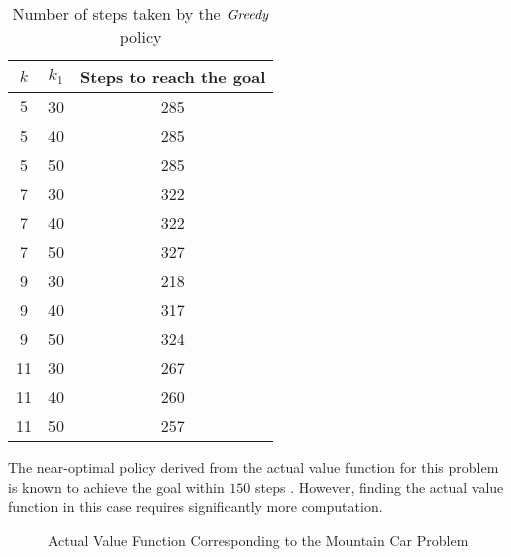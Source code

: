 \FloatBarrier
\begin{table}[H]
\begin{tabular}{|c|c|c|} \hline
$k$ & $k_1$ &Steps to reach the goal\\ \hline	
$5$ &30 &285 \\ \hline
5 &40 &285 \\ \hline
5 &50 &285 \\ \hline

7 &30 &322 \\ \hline
7 &40 &322 \\ \hline
7 &50 &327 \\ \hline

9 &30 &218 \\ \hline
9 &40 &317 \\ \hline
9 &50 &324 \\ \hline

11 &30 &267 \\ \hline
11 &40 &260 \\ \hline
11 &50 &257 \\ \hline
\end{tabular}
\caption{Number of steps taken by the $\emph{Greedy}$ policy}
\label{episode}
\end{table}
The near-optimal policy derived from the actual value function for this problem is known to achieve the goal within $150$ steps \cite{rl}. However, finding the actual value function in this case requires significantly more computation.
\FloatBarrier
\begin{figure}[H]
\caption{Actual Value Function Corresponding to the Mountain Car Problem}
\label{actvalfunc}
\end{figure}


